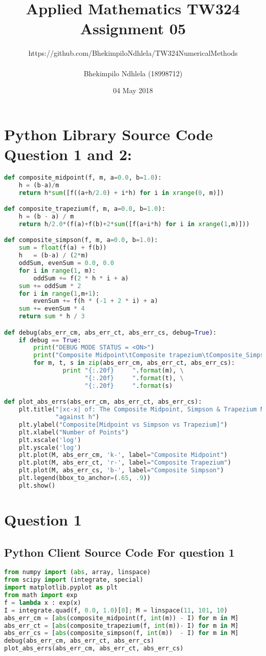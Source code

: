 \documentclass{article}
\title{Applied Mathematics TW324 Assignment 05}
\author{https://github.com/BhekimpiloNdhlela/TW324NumericalMethods \\ \\ Bhekimpilo Ndhlela (18998712)}
\date{04 May 2018}
\begin{document}
\maketitle
\pagebreak
\section*{Python Library Source Code Question 1 and 2: }
\begin{lstlisting}[language=Python]
def composite_midpoint(f, m, a=0.0, b=1.0):
    h = (b-a)/m
    return h*sum([f((a+h/2.0) + i*h) for i in xrange(0, m)])

def composite_trapezium(f, m, a=0.0, b=1.0):
    h = (b - a) / m
    return h/2.0*(f(a)+f(b)+2*sum([f(a+i*h) for i in xrange(1,m)]))

def composite_simpson(f, m, a=0.0, b=1.0):
    sum = float(f(a) + f(b))
    h   = (b-a) / (2*m)
    oddSum, evenSum = 0.0, 0.0
    for i in range(1, m):
        oddSum += f(2 * h * i + a)
    sum += oddSum * 2
    for i in range(1,m+1):
        evenSum += f(h * (-1 + 2 * i) + a)
    sum += evenSum * 4
    return sum * h / 3

def debug(abs_err_cm, abs_err_ct, abs_err_cs, debug=True):
    if debug == True:
        print("DEBUG MODE STATUS = <ON>")
        print("Composite Midpoint\tComposite trapezium\tComposite_Simpson")
        for m, t, s in zip(abs_err_cm, abs_err_ct, abs_err_cs):
                print "{:.20f}     ".format(m), \
                      "{:.20f}     ".format(t), \
                      "{:.20f}     ".format(s)

def plot_abs_errs(abs_err_cm, abs_err_ct, abs_err_cs):
    plt.title("|xc-x| of: The Composite Midpoint, Simpson & Trapezium Methods"\
              "against h")
    plt.ylabel("Composite[Midpoint vs Simpson vs Trapezium]")
    plt.xlabel("Number of Points")
    plt.xscale('log')
    plt.yscale('log')
    plt.plot(M, abs_err_cm, 'k-', label="Composite Midpoint")
    plt.plot(M, abs_err_ct, 'r-', label="Composite Trapezium")
    plt.plot(M, abs_err_cs, 'b-', label="Composite Simpson")
    plt.legend(bbox_to_anchor=(.65, .9))
    plt.show()
\end{lstlisting}
\pagebreak


\section*{Question 1}
\subsection*{Python Client Source Code For question 1}
\begin{lstlisting}[language=Python]
from numpy import (abs, array, linspace)
from scipy import (integrate, special)
import matplotlib.pyplot as plt
from math import exp
f = lambda x : exp(x)
I = integrate.quad(f, 0.0, 1.0)[0]; M = linspace(11, 101, 10)
abs_err_cm = [abs(composite_midpoint(f, int(m)) - I) for m in M]
abs_err_ct = [abs(composite_trapezium(f, int(m))- I) for m in M]
abs_err_cs = [abs(composite_simpson(f, int(m))  - I) for m in M]
debug(abs_err_cm, abs_err_ct, abs_err_cs)
plot_abs_errs(abs_err_cm, abs_err_ct, abs_err_cs)
\end{lstlisting}
\end{document}
